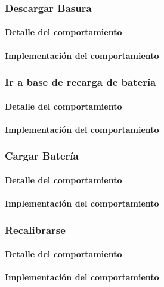 \subsubsection{Descargar Basura}
\label{unload_garbage}
\paragraph{Detalle del comportamiento}
\paragraph{Implementaci\'on del comportamiento}

\subsubsection{Ir a base de recarga de bater\'ia}
\label{go_to_recharge}
\paragraph{Detalle del comportamiento}
\paragraph{Implementaci\'on del comportamiento}

\subsubsection{Cargar Bater\'ia}
\label{recharge_battery}
\paragraph{Detalle del comportamiento}
\paragraph{Implementaci\'on del comportamiento}

\subsubsection{Recalibrarse}
\label{recalibrate}
\paragraph{Detalle del comportamiento}
\paragraph{Implementaci\'on del comportamiento}

